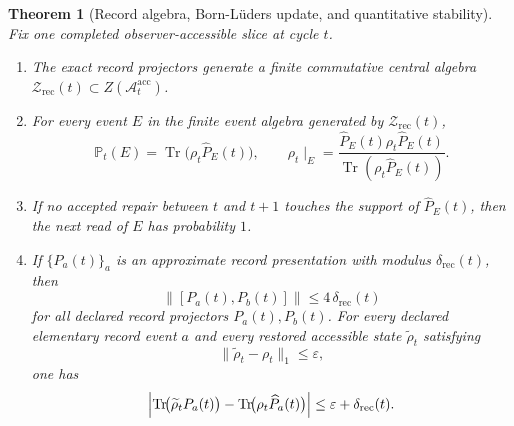\documentclass[11pt]{article}
\newtheorem{theorem}{Theorem}[section]
\theoremstyle{remark}
\theoremstyle{plain}
\begin{document}
\begin{theorem}[Record algebra, Born-L\"uders update, and quantitative stability]\label{thm:crdt}
Fix one completed observer-accessible slice at cycle \(t\).
\begin{enumerate}
\item The exact record projectors generate a finite commutative central algebra
\(\mathcal Z_{\mathrm{rec}}(t)\subset Z(\mathcal A_t^{\mathrm{acc}})\).
\item For every event \(E\) in the finite event algebra generated by \(\mathcal Z_{\mathrm{rec}}(t)\),
\[
\mathbb P_t(E)=\operatorname{Tr}\!\bigl(\rho_t \widehat P_E(t)\bigr),
\qquad
\rho_t\!\mid_E
=
\frac{\widehat P_E(t)\rho_t \widehat P_E(t)}
{\operatorname{Tr}(\rho_t \widehat P_E(t))}.
\]
\item If no accepted repair between \(t\) and \(t+1\) touches the support of \(\widehat P_E(t)\),
then the next read of \(E\) has probability \(1\).
\item If \(\{P_a(t)\}_a\) is an approximate record presentation with modulus
\(\delta_{\mathrm{rec}}(t)\), then
\[
\|[P_a(t),P_b(t)]\|\le 4\,\delta_{\mathrm{rec}}(t)
\]
for all declared record projectors \(P_a(t),P_b(t)\). For every declared elementary
record event \(a\) and every restored accessible state \(\widetilde\rho_t\) satisfying
\[
\|\widetilde\rho_t-\rho_t\|_1\le \varepsilon,
\]
one has
\[
\Bigl|
\operatorname{Tr}\!\bigl(\widetilde\rho_t P_a(t)\bigr)
-
\operatorname{Tr}\!\bigl(\rho_t \widehat P_a(t)\bigr)
\Bigr|
\le
\varepsilon+\delta_{\mathrm{rec}}(t).
\]
\end{enumerate}
\end{theorem}
\end{document}
